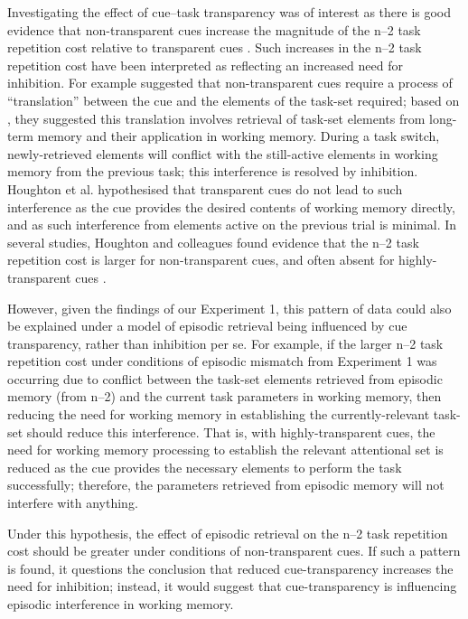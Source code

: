 \documentclass[a4paper, doc, natbib]{apa6}
\begin{document}
Investigating the effect of cue--task transparency was of interest as there is good evidence that non-transparent cues increase the magnitude of the n--2 task repetition cost relative to transparent cues \citep[e.g.,][]{Gade2014, Grange2009, Grange2010, Houghton2009}. Such increases in the n--2 task repetition cost have been interpreted as reflecting an increased need for inhibition. For example \cite{Houghton2009} suggested that non-transparent cues require a process of ``translation'' between the cue and the elements of the task-set required; based on \cite{Mayr2000a}, they suggested this translation involves retrieval of task-set elements from long-term memory and their application in working memory. During a task switch, newly-retrieved elements will conflict with the still-active elements in working memory from the previous task; this interference is resolved by inhibition. Houghton et al. hypothesised that transparent cues do not lead to such interference as the cue provides the desired contents of working memory directly, and as such interference from elements active on the previous trial is minimal. In several studies, Houghton and colleagues \citep{Grange2009, Grange2010, Houghton2009} found evidence that the n--2 task repetition cost is larger for non-transparent cues, and often absent for highly-transparent cues \citep[but see][for a discussion on interpreting null n--2 task repetition costs]{Grange2013}.  

However, given the findings of our Experiment 1, this pattern of data could also be explained under a model of episodic retrieval being influenced by cue transparency, rather than inhibition per se. For example, if the larger n--2 task repetition cost under conditions of episodic mismatch from Experiment 1 was occurring due to conflict between the task-set elements retrieved from episodic memory (from n--2) and the current task parameters in working memory, then reducing the need for working memory in establishing the currently-relevant task-set should reduce this interference. That is, with highly-transparent cues, the need for working memory processing to establish the relevant attentional set is reduced as the cue provides the necessary elements to perform the task successfully; therefore, the parameters retrieved from episodic memory will not interfere with anything. 

Under this hypothesis, the effect of episodic retrieval on the n--2 task repetition cost should be greater under conditions of non-transparent cues. If such a pattern is found, it questions the conclusion that reduced cue-transparency increases the need for inhibition; instead, it would suggest that cue-transparency is influencing episodic interference in working memory. 
\end{document}
